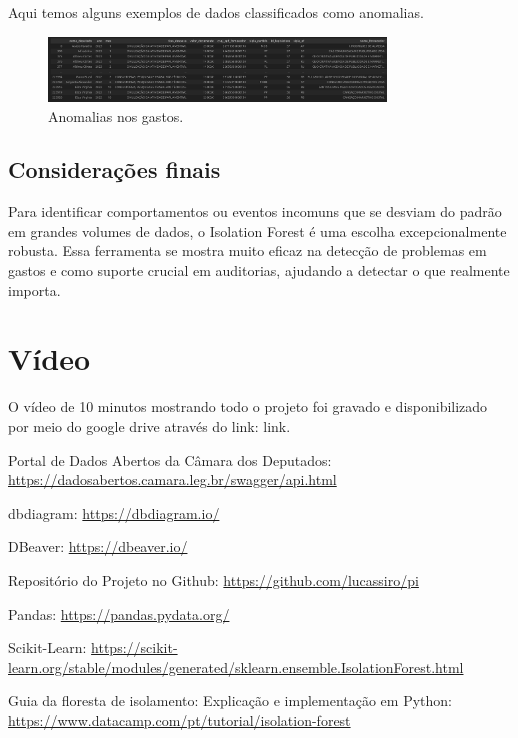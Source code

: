 \documentclass[12pt, a4paper]{article}
\begin{document}
Aqui temos alguns exemplos de dados classificados como anomalias.

\begin{figure}[!htbp]
	\centering
	\includegraphics[width=0.8\textwidth]{assets/3_plot1.png}
	\caption{Anomalias nos gastos.}
	\label{fig:anomalias}
\end{figure}

\subsection{Considerações finais}

Para identificar comportamentos ou eventos incomuns que se desviam do padrão em grandes volumes de dados, o Isolation Forest é uma escolha excepcionalmente robusta. Essa ferramenta se mostra muito eficaz na detecção de problemas em gastos e como suporte crucial em auditorias, ajudando a detectar o que realmente importa.

\section{Vídeo}
O vídeo de 10 minutos mostrando todo o projeto foi gravado e disponibilizado por meio do google drive através do link: link.

\begin{thebibliography}{9}
     Portal de Dados Abertos da Câmara dos Deputados: 
    \href{https://dadosabertos.camara.leg.br/swagger/api.html}{https://dadosabertos.camara.leg.br/swagger/api.html}

     dbdiagram: 
    \href{https://dbdiagram.io/}{https://dbdiagram.io/}
    
     DBeaver: 
    \href{https://dbeaver.io/}{https://dbeaver.io/}

     Repositório do Projeto no Github: 
    \href{https://github.com/lucassiro/pi}{https://github.com/lucassiro/pi}
    
     Pandas: 
    \href{https://pandas.pydata.org/}{https://pandas.pydata.org/}
    
     Scikit-Learn: 
    \href{https://scikit-learn.org/stable/modules/generated/sklearn.ensemble.IsolationForest.html}{https://scikit-learn.org/stable/modules/generated/sklearn.ensemble.IsolationForest.html}
    
     Guia da floresta de isolamento: Explicação e implementação em Python: 
    \href{https://www.datacamp.com/pt/tutorial/isolation-forest}{https://www.datacamp.com/pt/tutorial/isolation-forest}
\end{thebibliography}
\end{document}
